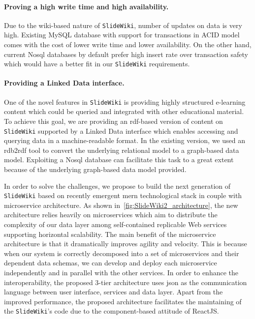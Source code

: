 \documentclass[PhD, Submit, ngerman,UKenglish,table]{scrbook}
\begin{document}
\paragraph{Proving a high write time and high availability.}
Due to the wiki-based nature of \texttt{SlideWiki}, number of updates on data is very high.
Existing MySQL database with support for transactions in ACID model comes with the cost of lower write time and lower availability.
On the other hand, current No\gls{sql} databases by default prefer high insert rate over transaction safety which would have a better fit in our \texttt{SlideWiki} requirements.

\paragraph{Providing a Linked Data interface.}
One of the novel features in \texttt{SlideWiki} is providing highly structured e-learning content which could be queried and integrated with other educational material.
To achieve this goal, we are providing an \gls{rdf}-based version of content on \texttt{SlideWiki} supported by a Linked Data interface which enables accessing and querying  data in a machine-readable format.
In the existing version, we used an \gls{rdb2rdf} tool to convert the underlying relational model to a graph-based data model.
Exploiting a No\gls{sql} database can facilitate this task to a great extent because of the underlying graph-based data model provided.

In order to solve the challenges, we propose to build the next generation of \texttt{SlideWiki} based on recently emergent \gls{mern} technological stack in couple with microservice architecture.
As shown in~\autoref{fig:SlideWiki2_architecture}, the new architecture relies heavily on microservices which aim to distribute the complexity of our data layer among self-contained replicable Web services supporting horizontal scalability.
The main benefit of the microservice architecture is that it dramatically improves agility and velocity.
This is because when our system is correctly decomposed into a set of microservices and their dependent data schemas, we can develop and deploy each microservice independently and in parallel with the other services.
In order to enhance the interoperability, the proposed 3-tier architecture uses \gls{json} as the communication language between user interface, services and data layer.
Apart from the improved performance, the proposed architecture facilitates the maintaining of the \texttt{SlideWiki}'s code due to the component-based attitude of ReactJS.
\end{document}
